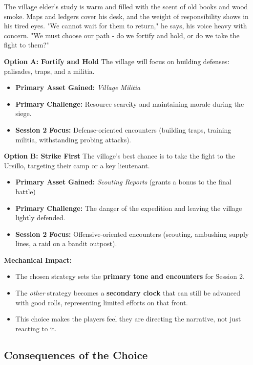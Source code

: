 \documentclass[11pt]{article}
\begin{document}
The village elder's study is warm and filled with the scent of old books and wood smoke. Maps and ledgers cover his desk, and the weight of responsibility shows in his tired eyes. "We cannot wait for them to return," he says, his voice heavy with concern. "We must choose our path - do we fortify and hold, or do we take the fight to them?"

\textbf{Option A: Fortify and Hold}
The village will focus on building defenses: palisades, traps, and a militia.
\begin{itemize}
\item \textbf{Primary Asset Gained:} \textit{Village Militia}
\item \textbf{Primary Challenge:} Resource scarcity and maintaining morale during the siege.
\item \textbf{Session 2 Focus:} Defense-oriented encounters (building traps, training militia, withstanding probing attacks).
\end{itemize}

\textbf{Option B: Strike First}
The village's best chance is to take the fight to the Ursillo, targeting their camp or a key lieutenant.
\begin{itemize}
\item \textbf{Primary Asset Gained:} \textit{Scouting Reports} (grants a bonus to the final battle)
\item \textbf{Primary Challenge:} The danger of the expedition and leaving the village lightly defended.
\item \textbf{Session 2 Focus:} Offensive-oriented encounters (scouting, ambushing supply lines, a raid on a bandit outpost).
\end{itemize}

\textbf{Mechanical Impact:}
\begin{itemize}
\item The chosen strategy sets the \textbf{primary tone and encounters} for Session 2.
\item The \textit{other} strategy becomes a \textbf{secondary clock} that can still be advanced with good rolls, representing limited efforts on that front.
\item This choice makes the players feel they are directing the narrative, not just reacting to it.
\end{itemize}

\subsection{Consequences of the Choice}
\end{document}
